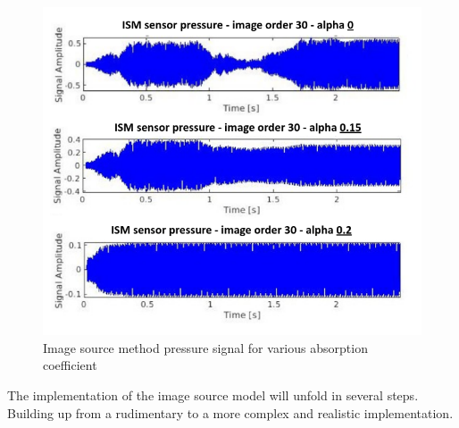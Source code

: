 \begin{figure}
    \centerline{\includegraphics[width=1.3\textwidth,keepaspectratio]{LaTeX/images/plots/matlab_ism_absorption_impact.png}}
    \caption{Image source method pressure signal for various absorption coefficient}
    \label{fig:ism_alpha_coef}
\end{figure}
\newpage
The implementation of the image source model will unfold in several steps. Building up from a rudimentary to a more complex and realistic implementation.
